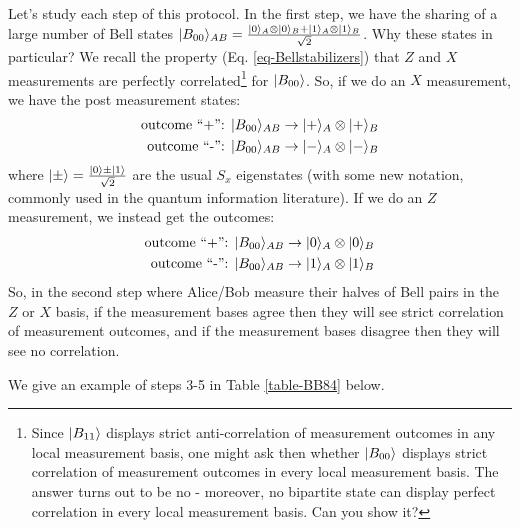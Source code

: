 Let's study each step of this protocol. In the first step, we have the sharing of a large number of Bell states $\lvert B_{00} \rangle_{AB} = \frac{\lvert 0 \rangle_A \otimes \lvert 0 \rangle_B +  \lvert 1 \rangle_A \otimes \lvert 1 \rangle_B}{\sqrt{2}}$. Why these states in particular? We recall the property (Eq. \eqref{eq-Bellstabilizers}) that $Z$ and $X$ measurements are perfectly correlated\footnote{Since $\lvert B_{11} \rangle$ displays strict anti-correlation of measurement outcomes in any local measurement basis, one might ask then whether $\lvert B_{00} \rangle$ displays strict correlation of measurement outcomes in every local measurement basis. The answer turns out to be no - moreover, no bipartite state can display perfect correlation in every local measurement basis. Can you show it?} for $\lvert B_{00} \rangle$. So, if we do an $X$ measurement, we have the post measurement states:
\begin{equation}
    \begin{split}
        \text{outcome ``+'': } \lvert B_{00} \rangle_{AB} &\to \lvert + \rangle_A \otimes \lvert + \rangle_B
        \\ \text{outcome  ``-'': } \lvert B_{00} \rangle_{AB} &\to \lvert - \rangle_A \otimes \lvert - \rangle_B
    \end{split}
\end{equation}
where $\lvert \pm \rangle = \frac{\lvert 0 \rangle \pm \lvert 1 \rangle}{\sqrt{2}}$ are the usual $S_x$ eigenstates (with some new notation, commonly used in the quantum information literature). If we do an $Z$ measurement, we instead get the outcomes:
\begin{equation}
    \begin{split}
        \text{outcome ``+'': } \lvert B_{00} \rangle_{AB} &\to \lvert 0 \rangle_A \otimes \lvert 0 \rangle_B
        \\ \text{outcome  ``-'': } \lvert B_{00} \rangle_{AB} &\to \lvert 1 \rangle_A \otimes \lvert 1 \rangle_B
    \end{split}
\end{equation}
So, in the second step where Alice/Bob measure their halves of Bell pairs in the $Z$ or $X$ basis, if the measurement bases agree then they will see strict correlation of measurement outcomes, and if the measurement bases disagree then they will see no correlation.

We give an example of steps 3-5 in Table \ref{table-BB84} below.

